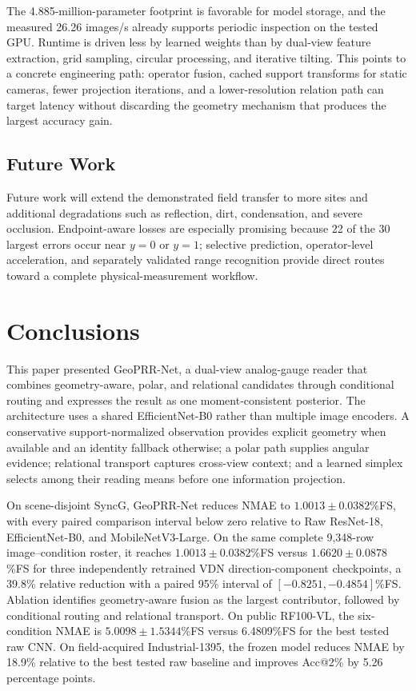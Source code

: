 \documentclass[electronics,article,submit,oneauthor]{Definitions/mdpi}
\newcommand{\modelname}{GeoPRR-Net\xspace}
\begin{document}
The 4.885-million-parameter footprint is favorable for model storage, and the measured 26.26 images/s already supports periodic inspection on the tested GPU. Runtime is driven less by learned weights than by dual-view feature extraction, grid sampling, circular processing, and iterative tilting. This points to a concrete engineering path: operator fusion, cached support transforms for static cameras, fewer projection iterations, and a lower-resolution relation path can target latency without discarding the geometry mechanism that produces the largest accuracy gain.

\subsection{Future Work}

Future work will extend the demonstrated field transfer to more sites and additional degradations such as reflection, dirt, condensation, and severe occlusion. Endpoint-aware losses are especially promising because 22 of the 30 largest errors occur near $y=0$ or $y=1$; selective prediction, operator-level acceleration, and separately validated range recognition provide direct routes toward a complete physical-measurement workflow.

\section{Conclusions}
\label{sec:conclusion}

This paper presented \modelname, a dual-view analog-gauge reader that combines geometry-aware, polar, and relational candidates through conditional routing and expresses the result as one moment-consistent posterior. The architecture uses a shared EfficientNet-B0 rather than multiple image encoders. A conservative support-normalized observation provides explicit geometry when available and an identity fallback otherwise; a polar path supplies angular evidence; relational transport captures cross-view context; and a learned simplex selects among their reading means before one information projection.

On scene-disjoint SyncG, \modelname reduces NMAE to $1.0013\pm0.0382$\%FS, with every paired comparison interval below zero relative to Raw ResNet-18, EfficientNet-B0, and MobileNetV3-Large. On the same complete 9,348-row image--condition roster, it reaches $1.0013\pm0.0382$\%FS versus $1.6620\pm0.0878$\%FS for three independently retrained VDN direction-component checkpoints, a 39.8\% relative reduction with a paired 95\% interval of $[-0.8251,-0.4854]$\%FS. Ablation identifies geometry-aware fusion as the largest contributor, followed by conditional routing and relational transport. On public RF100-VL, the six-condition NMAE is $5.0098\pm1.5344$\%FS versus 6.4809\%FS for the best tested raw CNN. On field-acquired Industrial-1395, the frozen model reduces NMAE by 18.9\% relative to the best tested raw baseline and improves Acc@2\% by 5.26 percentage points.
\end{document}
